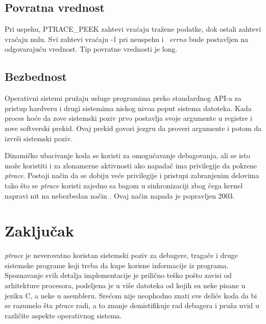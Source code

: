 \documentclass[a4paper]{article}
\begin{document}
\subsection{Povratna vrednost}	
\label{sec:return}

Pri uspehu, PTRACE\_PEEK zahtevi vraćaju tražene podatke, dok ostali zahtevi vraćaju nulu. 
Svi zahtevi vraćaju -1 pri neuspehu i ~\emph{errno} bude postavljen na odgovarajuću vrednost.
Tip povratne vrednosti je long.


\subsection{Bezbednost}	

Operativni sistemi pružaju usluge programima preko standardnog API-a za pristup
hardveru i drugi sistemima niskog nivoa poput sistema datoteka. 
Kada proces hoće da zove sistemski poziv prvo postavlja svoje argumente u registre i 
zove softverski prekid. Ovaj prekid govori jezgru da proveri argumente i potom da
izvrši sistemski poziv.

Dinamičko ubacivanje koda se koristi za omogućavanje debagovanja, ali se isto može koristiti
i za zlonamerne aktivnosti ako napadač ima privilegije da pokrene \emph{ptrace}. 
Postoji način da se dobiju veće privilegije i pristupi zabranjenim delovima tako što se \emph{ptrace} koristi zajedno
sa bagom u sinhronizaciji zbog čega kernel napravi nit na nebezbedan način \cite{hack}. 
Ovaj način napada je popravljen 2003.

\section{Zaključak}

\emph{ptrace} je neverovatno koristan sistemski poziv za debagere, tragače i druge sistemske 
programe koji treba da kupe korisne informacije iz programa. Spoznavanje svih detalja implementacije 
je prilično teško pošto zavisi od arhitekture procesora, podeljena je u više datoteka od kojih su
neke pisane u jeziku C, a neke u asembleru. Srećom nije neophodno znati sve deliće koda da bi
se razumelo šta \emph{ptrace} radi, a to znanje demistifikuje rad debagera i pruža uvid u različite 
aspekte operativnog sistema.

\appendix
 


\appendix
\end{document}
